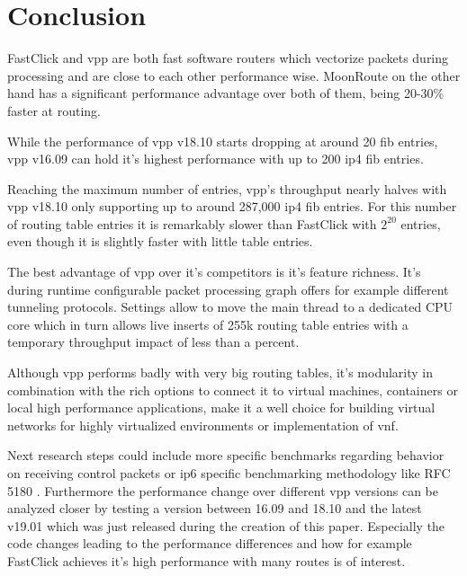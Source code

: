 \chapter{Conclusion}

FastClick and \Ac{vpp} are both fast software routers which vectorize
packets during processing and are close to each other performance
wise. MoonRoute on the other hand has a significant performance
advantage over both of them, being 20-30\% faster at routing.

While the performance of \Ac{vpp} v18.10 starts dropping at around 20
\Ac{fib} entries, \Ac{vpp} v16.09 can hold it's highest performance
with up to 200 \Ac{ip4} \Ac{fib} entries. 

Reaching the maximum number of entries, \Ac{vpp}'s throughput nearly
halves with \Ac{vpp} v18.10 only supporting up to around 287,000
\Ac{ip4} \Ac{fib} entries. For this number of routing table entries it
is remarkably slower than FastClick with $2^{20}$ entries, even though
it is slightly faster with little table entries.

The best advantage of \Ac{vpp} over it's competitors is it's feature
richness. It's during runtime configurable packet processing graph
offers for example different tunneling protocols. Settings allow to
move the main thread to a dedicated CPU core which in turn allows live
inserts of 255k routing table entries with a temporary throughput
impact of less than a percent.

Although \Ac{vpp} performs badly with very big routing tables, it's
modularity in combination with the rich options to connect it to
virtual machines, containers or local high performance applications,
make it a well choice for building virtual networks for highly
virtualized environments or implementation of \Ac{vnf}.

Next research steps could include more specific benchmarks regarding
behavior on receiving control packets or \Ac{ip6} specific
benchmarking methodology like RFC 5180 \cite{rfc5180}. Furthermore the
performance change over different \Ac{vpp} versions can be analyzed
closer by testing a version between 16.09 and 18.10 and the latest
v19.01 which was just released during the creation of this paper.
Especially the code changes leading to the performance differences and
how for example FastClick achieves it's high performance with many
routes is of interest.


